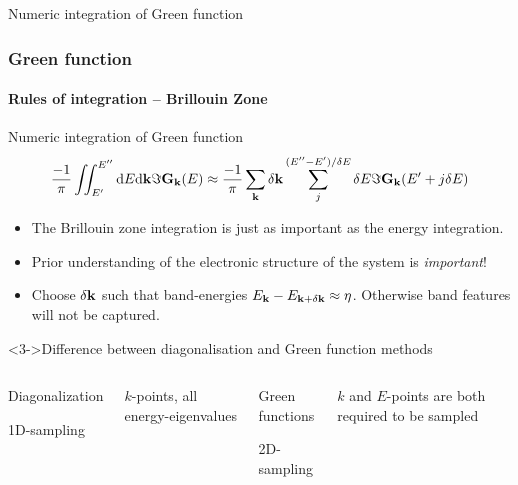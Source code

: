 \begin{frame}[label=integration]
\begin{block}{Numeric integration of Green function}
  \end{block}


\end{frame}


\begin{frame}
  \frametitle{Green function}
  \framesubtitle{Rules of integration -- Brillouin Zone}


  \begin{block}{Numeric integration of Green function}
    \small 
    \begin{equation*}
      \frac{-1}\pi\iint_{E'}^{E''} \mathrm{d} E\mathrm{d} \mathbf{k}\Im \mathbf{G}_{\mathbf{k}}(E) \approx \frac{-1}\pi
      \sum_{\mathbf{k}}\delta\mathbf{k}\sum_j^{(E''-E')/\delta E} \delta E \Im \mathbf{G}_{\mathbf{k}}(E'+j\delta E)
    \end{equation*}

    \begin{itemize}
      \item%
      The Brillouin zone integration is just as important as the energy integration.

      \item%
      Prior understanding of the electronic structure of the system is \emph{important}! 

      \item<2->%
      Choose $\delta\mathbf{k}$ such that band-energies $E_{\mathbf{k}} -
      E_{\mathbf{k}+\delta\mathbf{k}}\approx \eta$. Otherwise band features will not be captured.
      
    \end{itemize}

  \end{block}

  \begin{block}<3->{Difference between diagonalisation and Green function methods}

    \begin{columns}[t]

      \begin{center}
        Diagonalization

        \Large 1D-sampling
      \end{center}

      $k$-points, all energy-eigenvalues


      \begin{center}
        Green functions

        \Large 2D-sampling
      \end{center}

      $k$ and $E$-points are both required to be sampled

    \end{columns}
    
  \end{block}

\end{frame}


